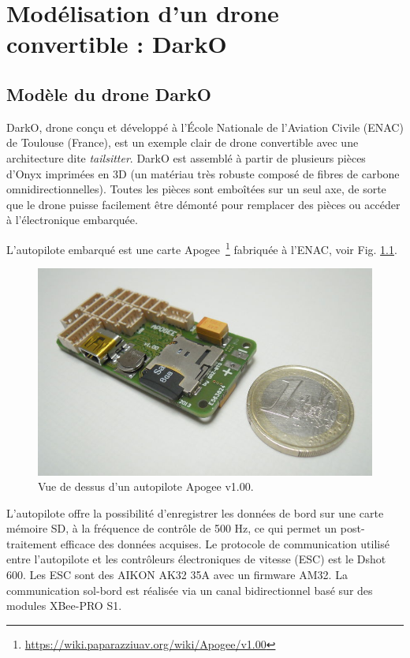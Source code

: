 \chapter{Modélisation d'un drone convertible : DarkO}
\minitoc
\label{chap:model}

\section{Modèle du drone DarkO}
\label{sec:model}
DarkO, drone conçu et développé à l'École Nationale de l'Aviation Civile (ENAC)  de Toulouse (France), est un exemple clair de drone convertible avec une architecture dite \textit{tailsitter}.
DarkO est assemblé à partir de plusieurs pièces d'Onyx imprimées en 3D (un matériau très robuste composé de fibres de carbone omnidirectionnelles). Toutes les pièces sont emboîtées sur un seul axe, de sorte que le drone puisse facilement être démonté pour remplacer des pièces ou accéder à l'électronique embarquée. 

L'autopilote embarqué est une carte Apogee~\footnote{\url{https://wiki.paparazziuav.org/wiki/Apogee/v1.00}} fabriquée à l'ENAC, voir Fig. \ref{fig:apogee}. 


\begin{figure}[ht!]
    \centering
        \includegraphics[width=0.6\columnwidth]{figures/800px-Apogee_v100_top_1E.jpeg}
        \caption{Vue de dessus d'un autopilote Apogee v1.00.}
        \label{fig:apogee}
\end{figure}

L'autopilote offre la possibilité d'enregistrer les données de bord sur une carte mémoire SD, à la fréquence de contrôle de 500 Hz, ce qui permet un post-traitement efficace des données acquises. Le protocole de communication utilisé entre l'autopilote et les contrôleurs électroniques de vitesse (ESC) est le Dshot 600. Les ESC sont des AIKON AK32 35A avec un firmware AM32. La communication sol-bord est réalisée via un canal bidirectionnel basé sur des modules XBee-PRO S1.

